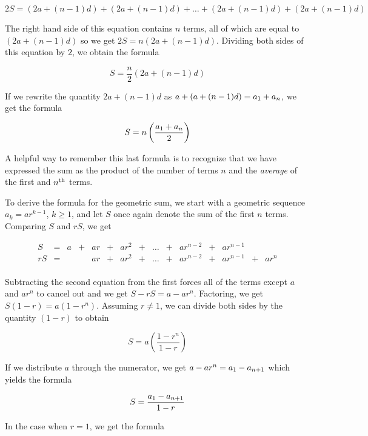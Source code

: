 \documentclass{ximera}
\begin{document}
\[2S = (2a + (n-1)d) + (2a + (n-1)d) + \ldots + (2a + (n-1)d) + (2a + (n-1)d)\]


The right hand side of this equation contains $n$ terms, all of  which are equal to $(2a + (n-1)d)$ so we get $2S = n(2a + (n-1)d)$.  Dividing both sides of this equation by $2$, we obtain the formula

\[S =  \dfrac{n}{2} (2a + (n-1)d)\]

If we rewrite the quantity $2a + (n-1)d$ as $a + (a + (n-1)d) = a_{\mbox{\scriptsize$1$}} + a_{n}$, we get the formula 

\[ S = n \left(\dfrac{a_{\mbox{\scriptsize$1$}} + a_{n}}{2}\right)\]

A helpful way to remember this last formula is to recognize that we have expressed the sum as the product of the number of terms $n$ and the \textit{average} of the first and $n^{\mbox{\scriptsize th}}$ terms.

\smallskip

To derive the formula for the geometric sum, we start with a geometric sequence $a_{k} = ar^{k-1}$, $k \geq 1$, and let $S$ once again denote the sum of the first $n$ terms.  Comparing  $S$ and $rS$, we get

\[ \begin{array}{ccccccccccccccc}

S & = & a & + & ar &  + & ar^2 & + & \ldots & + & ar^{n-2} & + & ar^{n-1} & & \\ 

r S & = & & & ar & + & ar^2 & + & \ldots &  + & ar^{n-2} & + & ar^{n-1} & + & ar^{n}  \\

\end{array}\]

Subtracting the second equation from the first forces all of the terms except $a$ and $ar^{n}$ to cancel out and we get $S - rS = a - ar^{n}$.  Factoring, we get $S(1-r) = a \left(1-r^{n}\right)$.  Assuming $r \neq 1$, we can divide both sides by  the quantity $(1-r)$ to obtain

\[S =  a \left( \dfrac{1-r^n}{1-r}\right)\]

If we distribute $a$ through the numerator, we get $a - ar^{n} = a_{\mbox{\scriptsize$1$}} - a_{n\mbox{\scriptsize$ + 1$}}$ which yields the formula

\[S =  \dfrac{a_{\mbox{\scriptsize$1$}}-a_{n\mbox{\scriptsize$ + 1$}}}{1-r}\]

In the case when $r=1$, we get the formula
\end{document}
